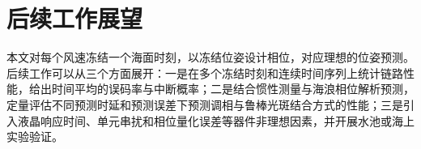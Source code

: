 \section{后续工作展望}

本文对每个风速冻结一个海面时刻，以冻结位姿设计相位，对应理想的位姿预测。后续工作可以从三个方面展开：一是在多个冻结时刻和连续时间序列上统计链路性能，给出时间平均的误码率与中断概率；二是结合惯性测量与海浪相位解析预测，定量评估不同预测时延和预测误差下预测调相与鲁棒光斑结合方式的性能；三是引入液晶响应时间、单元串扰和相位量化误差等器件非理想因素，并开展水池或海上实验验证。
